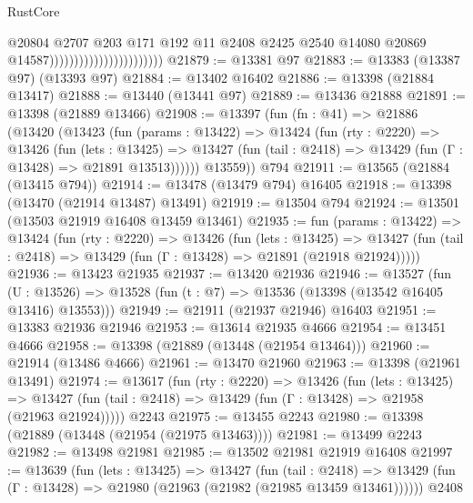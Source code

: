 \begin{lexlean}{RustCore}
\begin{coremodule}
                                                  @20804
                                                  @2707
                                                  @203
                                                  @171
                                                  @192
                                                  @11
                                                  @2408
                                                  @2425
                                                  @2540
                                                  @14080
                                                  @20869
                                                  @14587)))))))))))))))))))))))
@21879 := @13381 @97
@21883 := @13383 (@13387 @97) (@13393 @97)
@21884 := @13402 @16402
@21886 := @13398 (@21884 @13417)
@21888 := @13440 (@13441 @97)
@21889 := @13436 @21888
@21891 := @13398 (@21889 @13466)
@21908 := @13397
    (fun (fn : @41) =>
    @21886
      (@13420
        (@13423
          (fun (params : @13422) =>
          @13424
            (fun (rty : @2220) =>
            @13426
              (fun (lets : @13425) =>
              @13427 (fun (tail : @2418) => @13429 (fun (Γ : @13428) => @21891 @13513))))))
        @13559))
    @794
@21911 := @13565 (@21884 (@13415 @794))
@21914 := @13478 (@13479 @794) @16405
@21918 := @13398 (@13470 (@21914 @13487) @13491)
@21919 := @13504 @794
@21924 := @13501 (@13503 @21919 @16408 @13459 @13461)
@21935 := fun (params : @13422) =>
  @13424
    (fun (rty : @2220) =>
    @13426
      (fun (lets : @13425) =>
      @13427 (fun (tail : @2418) => @13429 (fun (Γ : @13428) => @21891 (@21918 @21924)))))
@21936 := @13423 @21935
@21937 := @13420 @21936
@21946 := @13527
    (fun (U : @13526) => @13528 (fun (t : @7) => @13536 (@13398 (@13542 @16405 @13416) @13553)))
@21949 := @21911 (@21937 @21946) @16403
@21951 := @13383 @21936 @21946
@21953 := @13614 @21935 @4666
@21954 := @13451 @4666
@21958 := @13398 (@21889 (@13448 (@21954 @13464)))
@21960 := @21914 (@13486 @4666)
@21961 := @13470 @21960
@21963 := @13398 (@21961 @13491)
@21974 := @13617
    (fun (rty : @2220) =>
    @13426
      (fun (lets : @13425) =>
      @13427 (fun (tail : @2418) => @13429 (fun (Γ : @13428) => @21958 (@21963 @21924)))))
    @2243
@21975 := @13455 @2243
@21980 := @13398 (@21889 (@13448 (@21954 (@21975 @13463))))
@21981 := @13499 @2243
@21982 := @13498 @21981
@21985 := @13502 @21981 @21919 @16408
@21997 := @13639
    (fun (lets : @13425) =>
    @13427
      (fun (tail : @2418) =>
      @13429 (fun (Γ : @13428) => @21980 (@21963 (@21982 (@21985 @13459 @13461))))))
    @2408

\end{coremodule}
\end{lexlean}

